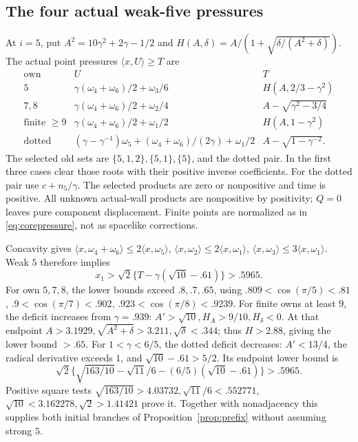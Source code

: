 \documentclass[11pt]{article}
\theoremstyle{definition}
\theoremstyle{remark}
\newcommand{\ip}[2]{\langle #1,#2\rangle}
\begin{document}
\subsection{The four actual weak-five pressures}
At \(i=5\), put \(A^2=10\gamma^2+2\gamma-1/2\) and
\(H(A,\delta)=A/(1+\sqrt{\delta/(A^2+\delta)})\).
The actual point pressures \(\ip{x}{U}\geq T\) are
\[
\begin{array}{c|l|l}
\text{own}&U&T\\ \hline
5&\gamma(\omega_4+\omega_6)/2+\omega_3/6
 &H(A,2/3-\gamma^2)\\
7,8&\gamma(\omega_4+\omega_6)/2+\omega_2/4
 &A-\sqrt{\gamma^2-3/4}\\
\text{finite }\geq9&\gamma(\omega_4+\omega_6)/2+\omega_1/2
 &H(A,1-\gamma^2)\\
\text{dotted}&(\gamma-\gamma^{-1})\omega_5+
 (\omega_4+\omega_6)/(2\gamma)+\omega_1/2
 &A-\sqrt{1-\gamma^{-2}}.
\end{array}
\]
The selected old sets are \(\{5,1,2\},\{5,1\},\{5\}\),
and the dotted pair. In the first three cases clear
those roots with their positive inverse coefficients.
For the dotted pair use \(c+n_5/\gamma\).
The selected products are zero or nonpositive and
time is positive. All unknown actual-wall products
are nonpositive by positivity; \(Q=0\) leaves pure
component displacement. Finite points are normalized
as in \eqref{eq:corepressure}, not as spacelike corrections.

Concavity gives
\(\ip{x}{\omega_4+\omega_6}\leq2\ip{x}{\omega_5}\),
\(\ip{x}{\omega_2}\leq2\ip{x}{\omega_1}\),
\(\ip{x}{\omega_3}\leq3\ip{x}{\omega_1}\).
Weak \(5\) therefore implies
\[
 x_1>\sqrt2\{T-\gamma(\sqrt{10}-.61)\}>.5965.
\]
For own \(5,7,8\), the lower bounds exceed
\(.8,.7,.65\), using
\(.809<\cos(\pi/5)<.81\),
\(.9<\cos(\pi/7)<.902\),
\(.923<\cos(\pi/8)<.9239\).
For finite owns at least \(9\), the deficit increases
from \(\gamma=.939\):
\(A'>\sqrt{10},H_A>9/10,H_\delta<0\).
At that endpoint
\(A>3.1929,\sqrt{A^2+\delta}>3.211,\sqrt\delta<.344\);
thus \(H>2.88\), giving the lower bound \(>.65\).
For \(1<\gamma<6/5\), the dotted deficit decreases:
\(A'<13/4\), the radical derivative exceeds \(1\),
and \(\sqrt{10}-.61>5/2\).
Its endpoint lower bound is
\[
 \sqrt2\{\sqrt{163/10}-\sqrt{11}/6
                -(6/5)(\sqrt{10}-.61)\}>.5965.
\]
Positive square tests
\(\sqrt{163/10}>4.03732,\sqrt{11}/6<.552771\),
\(\sqrt{10}<3.162278,\sqrt2>1.41421\)
prove it. Together with nonadjacency this supplies
both initial branches of Proposition~\ref{prop:prefix}
without assuming strong \(5\).
\end{document}
